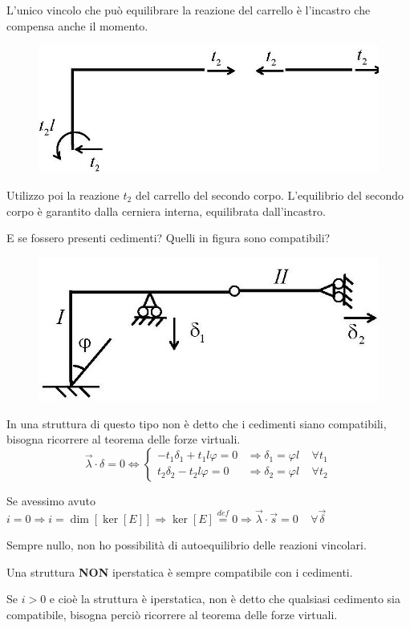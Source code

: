 \documentclass{article}
\newcommand{\Def}{\overset{\mathit{def}}{=}}
\begin{document}
\begin{adjustwidth}{2in}{}
 L'unico vincolo che può equilibrare la reazione del carrello è l'incastro che compensa anche il momento. \newline
 \begin{figure}[H]
 	\centering
 	\includegraphics[width=0.35\linewidth]{immagini/1.PARTE4_Pagina_11}
 \end{figure}
 Utilizzo poi la reazione $t_2$ del carrello del secondo corpo.
 L'equilibrio del secondo corpo è garantito dalla cerniera interna, equilibrata dall'incastro.
 
 \newpage
 
 E se fossero presenti cedimenti? Quelli in figura sono compatibili? 
 \begin{figure}[H]
	\centering
	\includegraphics[width=0.35\linewidth]{immagini/1.PARTE4_Pagina_12 (2)}
\end{figure}
 In una struttura di questo tipo non è detto che i cedimenti siano compatibili, bisogna ricorrere al teorema delle forze virtuali. 
 \[
 \vec{\lambda} \cdot \delta = 0 \Leftrightarrow \begin{cases}
 	-t_1 \delta_1 + t_1 l \varphi = 0 & \Rightarrow \delta_1 = \varphi l ~~~~~ \forall t_1 \\
 	t_2 \delta_2 - t_2 l \varphi = 0 & \Rightarrow \delta_2 = \varphi l ~~~~~ \forall t_2
 \end{cases}
 \]
 
 Se avessimo avuto $ i = 0 \Rightarrow i = \dim[\ker{[E]}] \Rightarrow \ker{[E]} \Def 0 \Rightarrow \vec{\lambda} \cdot \vec{s} = 0 ~~~~~ \forall \vec{\delta}$
 
 Sempre nullo, non ho possibilità di autoequilibrio delle reazioni vincolari. 
 
 Una struttura \textbf{NON} iperstatica è sempre compatibile con i cedimenti.\newline
 
 Se $ i > 0$ e cioè la struttura è iperstatica, non è detto che qualsiasi cedimento sia compatibile, bisogna perciò ricorrere al teorema delle forze virtuali. \newline
 

\end{adjustwidth}
\end{document}
